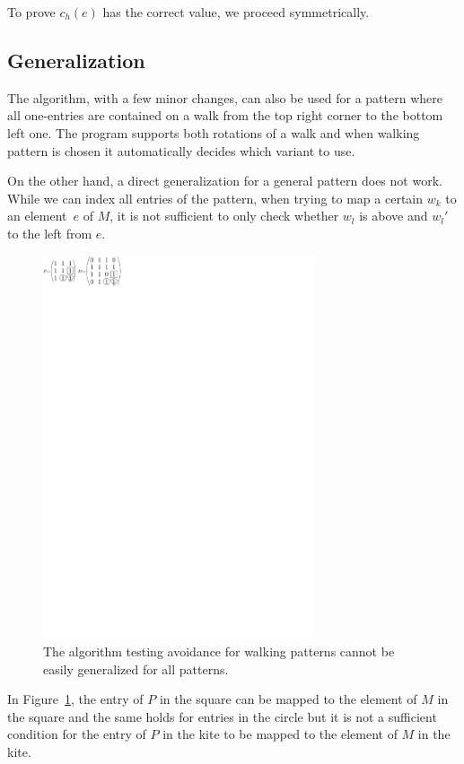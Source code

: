 To prove $c_h(e)$ has the correct value, we proceed symmetrically.

\subsection{Generalization}
The algorithm, with a few minor changes, can also be used for a pattern where all one-entries are contained on a walk from the top right corner to the bottom left one. The program supports both rotations of a walk and when walking pattern is chosen it automatically decides which variant to use.

On the other hand, a direct generalization for a general pattern does not work. While we can index all entries of the pattern, when trying to map a certain $w_k$ to an element~$e$ of $M$, it is not sufficient to only check whether $w_l$ is above and $w_l'$ to the left from $e$.
\begin{figure}[h!]
\centering
\includegraphics[width=80mm]{../img/nogeneral.pdf}
\caption{The algorithm testing avoidance for walking patterns cannot be easily generalized for all patterns.}
\label{nogeneral}
\end{figure}

In Figure~\ref{nogeneral}, the entry of $P$ in the square can be mapped to the element of $M$ in the square and the same holds for entries in the circle but it is not a sufficient condition for the entry of $P$ in the kite to be mapped to the element of $M$ in the kite.